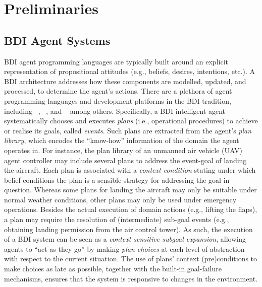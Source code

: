 \section{Preliminaries}\label{sec:preliminaries}

\subsection{BDI Agent Systems}


BDI agent programming languages are typically built around an explicit representation of propositional attitudes (e.g., beliefs, desires, intentions, etc.). A BDI architecture addresses how these components are modelled, updated, and processed, to determine the agent's actions.
There are a plethora of agent programming languages and development platforms in the BDI tradition, including
\JACK~\cite{BusettaRHL:AL99-JACK}, 
\JADEX~\cite{Pokahr:EXP03-JADEX}, and
\JASON~\cite{jasonbook}
among others. 
Specifically, a BDI intelligent agent systematically chooses and executes \emph{plans} (i.e., operational procedures) to achieve or realise its goals, called \emph{events}.
Such plans are extracted from the agent's \emph{plan library}, which encodes the ``know-how'' information of the domain the agent operates in.
For instance, the plan library of an unmanned air vehicle (UAV) agent controller may include several plans to address the event-goal of landing the aircraft. Each plan is associated with a \emph{context condition} stating under which belief conditions the plan is a sensible strategy for addressing the goal in question. Whereas some plans for landing the aircraft may only be suitable under normal weather conditions, other plans may only be used under emergency operations.
Besides the actual execution of domain actions (e.g., lifting the flaps), a plan may require the resolution of (intermediate) sub-goal events (e.g., obtaining landing permission from the air control tower). As such, the execution of a BDI system can be seen as a \textit{context sensitive subgoal expansion}, allowing agents to ``act as they go'' by making \emph{plan choices} at each level of abstraction with respect to the current situation. The use of plans' context (pre)conditions to make choices as late as possible, together with the built-in goal-failure mechanisms, ensures that the system is responsive to changes in the environment. 

